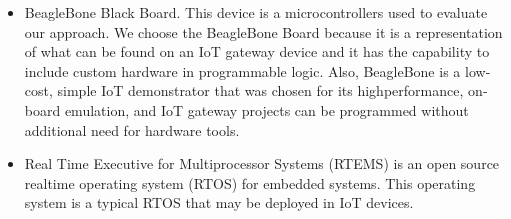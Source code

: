 \begin{itemize}
\item BeagleBone Black Board. This device is a microcontrollers used to evaluate our approach. We choose the BeagleBone Board because it is a representation of what can be found on an IoT gateway device and it has the capability to include custom hardware in programmable logic. Also, BeagleBone is a low­cost, simple IoT demonstrator that was chosen for its high­performance, on­board emulation, and IoT gateway projects can be programmed without additional need for hardware tools.

\item Real Time Executive for Multiprocessor Systems (RTEMS) is an open source real­time operating system (RTOS) for embedded systems. This operating system is a typical RTOS that may be deployed in IoT devices.

\end{itemize}


%
